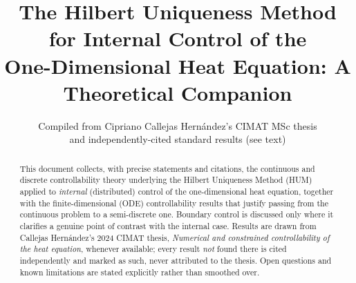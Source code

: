\documentclass[11pt]{article}
\title{The Hilbert Uniqueness Method for Internal Control of the\\
  One-Dimensional Heat Equation: A Theoretical Companion}
\author{Compiled from Cipriano Callejas Hern\'andez's CIMAT MSc thesis\\
  and independently-cited standard results (see text)}
\date{}
\theoremstyle{plain}
\theoremstyle{definition}
\theoremstyle{remark}
\begin{document}
\maketitle

\begin{abstract}
\noindent
This document collects, with precise statements and citations, the continuous
and discrete controllability theory underlying the Hilbert Uniqueness Method
(HUM) applied to \emph{internal} (distributed) control of the one-dimensional
heat equation, together with the finite-dimensional (ODE) controllability
results that justify passing from the continuous problem to a semi-discrete
one. Boundary control is discussed only where it clarifies a genuine point of
contrast with the internal case. Results are drawn from Callejas
Hern\'andez's 2024 CIMAT thesis, \emph{Numerical and constrained
controllability of the heat equation}, whenever available; every result
\emph{not} found there is cited independently and marked as such, never
attributed to the thesis. Open questions and known limitations are stated
explicitly rather than smoothed over.
\end{abstract}

\tableofcontents











\end{document}
